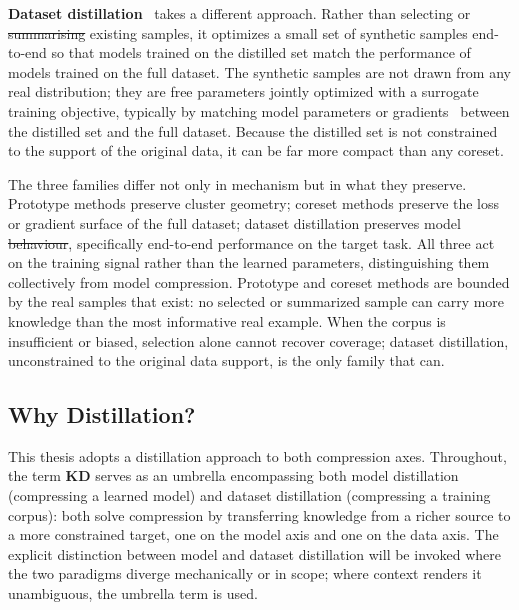 \documentclass[12pt, a4paper, twoside]{book}
\makeatletter
\numberwithin{equation}{chapter}
\theoremstyle{plain}
\theoremstyle{definition}
\theoremstyle{remark}
\newenvironment{foldable}{}{}
\providecommand{\DIFaddtex}[1]{{\protect\color{blue}\uwave{#1}}} %
\providecommand{\DIFdeltex}[1]{{\protect\color{red}\sout{#1}}} %
\providecommand{\DIFaddbegin}{} %
\providecommand{\DIFaddend}{} %
\providecommand{\DIFdelbegin}{} %
\providecommand{\DIFdelend}{} %
\providecommand{\DIFadd}[1]{\texorpdfstring{\DIFaddtex{#1}}{#1}} %
\providecommand{\DIFdel}[1]{\texorpdfstring{\DIFdeltex{#1}}{}} %
\newcommand{\DIFscaledelfig}{0.5}
\newlength{\DIFdelgraphicswidth} %
\newlength{\DIFdelgraphicsheight} %
\newcommand{\DIFaddincludegraphics}[2][]{{\color{blue}\fbox{\DIFOincludegraphics[#1]{#2}}}} %
\newcommand{\DIFdelincludegraphics}[2][]{%
\sbox{\DIFdelgraphicsbox}{\DIFOincludegraphics[#1]{#2}}%
\settoboxwidth{\DIFdelgraphicswidth}{\DIFdelgraphicsbox} %
\settoboxtotalheight{\DIFdelgraphicsheight}{\DIFdelgraphicsbox} %
\scalebox{\DIFscaledelfig}{%
\parbox[b]{\DIFdelgraphicswidth}{\usebox{\DIFdelgraphicsbox}\\[-\baselineskip] \rule{\DIFdelgraphicswidth}{0em}}\llap{\resizebox{\DIFdelgraphicswidth}{\DIFdelgraphicsheight}{%
\setlength{\unitlength}{\DIFdelgraphicswidth}%
\begin{picture}(1,1)%
\thicklines\linethickness{2pt} %
{\color[rgb]{1,0,0}\put(0,0){\framebox(1,1){}}}%
{\color[rgb]{1,0,0}\put(0,0){\line( 1,1){1}}}%
{\color[rgb]{1,0,0}\put(0,1){\line(1,-1){1}}}%
\end{picture}%
}\hspace*{3pt}}} %
} %
\DeclareRobustCommand{\DIFaddbegin}{\DIFOaddbegin \let\includegraphics\DIFaddincludegraphics} %
\DeclareRobustCommand{\DIFaddend}{\DIFOaddend \let\includegraphics\DIFOincludegraphics} %
\DeclareRobustCommand{\DIFdelbegin}{\DIFOdelbegin \let\includegraphics\DIFdelincludegraphics} %
\DeclareRobustCommand{\DIFdelend}{\DIFOaddend \let\includegraphics\DIFOincludegraphics} %
\let\sout@orig\sout %
\renewcommand{\sout}[1]{\ifmmode\text{\sout@orig{\ensuremath{#1}}}\else\sout@orig{#1}\fi} %
\makeatother
\begin{document}
\begin{foldable}
  \textbf{Dataset distillation}~\cite{wang2018dataset} takes a different approach.
  Rather than selecting or \DIFdelbegin \DIFdel{summarising }\DIFdelend \DIFaddbegin \DIFadd{summarizing }\DIFaddend existing samples, it optimizes a small set of synthetic samples end-to-end so that models trained on the distilled set match the performance of models trained on the full dataset.
  The synthetic samples are not drawn from any real distribution; they are free parameters jointly optimized with a surrogate training objective, typically by matching model parameters or gradients~\cite{zhao2021dataset} between the distilled set and the full dataset.
  Because the distilled set is not constrained to the support of the original data, it can be far more compact than any coreset.
\end{foldable}

\begin{foldable}
  The three families differ not only in mechanism but in what they preserve.
  Prototype methods preserve cluster geometry; coreset methods preserve the loss or gradient surface of the full dataset; dataset distillation preserves model \DIFdelbegin \DIFdel{behaviour}\DIFdelend \DIFaddbegin \DIFadd{behavior}\DIFaddend , specifically end-to-end performance on the target task.
  All three act on the training signal rather than the learned parameters, distinguishing them collectively from model compression.
  Prototype and coreset methods are bounded by the real samples that exist: no selected or summarized sample can carry more knowledge than the most informative real example.
  When the corpus is insufficient or biased, selection alone cannot recover coverage; dataset distillation, unconstrained to the original data support, is the only family that can.
\end{foldable}

\subsection{Why Distillation?} \label{sec:22-background-compression-whydistill}
\begin{foldable}
  This thesis adopts a distillation approach to both compression axes.
  Throughout, the term \textbf{\acl{KD}} serves as an umbrella encompassing both model distillation (compressing a learned model) and dataset distillation (compressing a training corpus): both solve compression by transferring knowledge from a richer source to a more constrained target, one on the model axis and one on the data axis.
  The explicit distinction between model and dataset distillation will be invoked where the two paradigms diverge mechanically or in scope; where context renders it unambiguous, the umbrella term is used.
\end{foldable}
\end{document}
